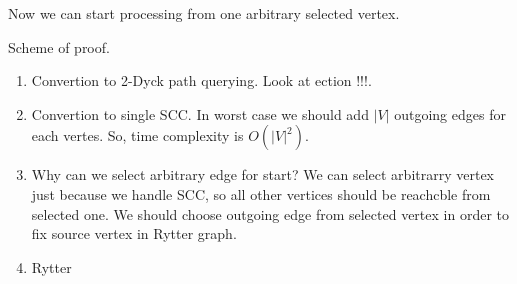 Now we can start processing from one arbitrary selected vertex.

Scheme of proof.
\begin{enumerate}
\item Convertion to 2-Dyck path querying. Look at ection !!!. 
\item Convertion to single SCC. In worst case we should add $|V|$ outgoing edges for each vertes. 
So, time complexity is $O(|V|^2)$.
\item Why can we select arbitrary edge for start?
We can select arbitrarry vertex just because we handle SCC, so all other vertices should be reachcble from selected one.
We should choose outgoing edge from selected vertex in order to fix source vertex in Rytter graph.
\item Rytter
\end{enumerate}